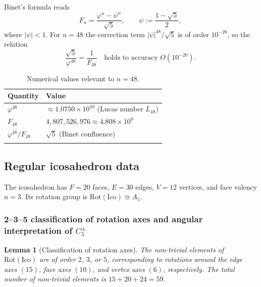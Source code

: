 \documentclass[sn-mathphys-num,Numbered]{sn-jnl}
\theoremstyle{thmstyleone}
\newtheorem{lemma}[theorem]{Lemma}
\theoremstyle{thmstylethree}
\theoremstyle{thmstyletwo}
\begin{document}
Binet's formula reads
\begin{equation}
  F_n = \frac{\varphi^n - \psi^n}{\sqrt{5}},
  \qquad \psi := \frac{1-\sqrt{5}}{2},
  \label{eq:binet}
\end{equation}
where $|\psi| < 1$. For $n = 48$ the correction term $|\psi|^{48}/\sqrt{5}$
is of order $10^{-20}$, so the relation
\begin{equation}
  \frac{\sqrt{5}}{\varphi^{48}} = \frac{1}{F_{48}}
  \quad \text{holds to accuracy } O(10^{-20}).
  \label{eq:binet-48}
\end{equation}

\begin{table}[h]
\caption{Numerical values relevant to $n = 48$.}
\label{tab:binet}
\begin{tabular}{@{}ll@{}}
\toprule
Quantity & Value \\
\midrule
$\varphi^{48}$ & $\approx 1.0750\times10^{10}$ (Lucas number $L_{48}$) \\
$F_{48}$ & $4{,}807{,}526{,}976 \approx 4.808\times10^{9}$ \\
$\varphi^{48}/F_{48}$ & $\sqrt{5}$ \quad (Binet confluence) \\
\botrule
\end{tabular}
\end{table}

\subsection{Regular icosahedron data}
\label{ssec:icosahedron}

The icosahedron has $F = 20$ faces, $E = 30$ edges, $V = 12$ vertices,
and face valency $n = 3$.  Its rotation group is
$\mathrm{Rot}(\mathrm{Ico}) \cong A_5$.

\subsubsection{2--3--5 classification of rotation axes and angular
interpretation of \texorpdfstring{$C_5^\pm$}{C5±}}
\label{sssec:axes}

\begin{lemma}[Classification of rotation axes]
\label{lem:axes}
The non-trivial elements of $\mathrm{Rot}(\mathrm{Ico})$ are of order
$2$, $3$, or $5$, corresponding to rotations around the edge axes $(15)$,
face axes $(10)$, and vertex axes $(6)$, respectively. The total number
of non-trivial elements is $15 + 20 + 24 = 59$.
\end{lemma}
\end{document}
